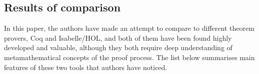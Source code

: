 \documentclass[article]{aaltoseries}
\begin{document}



\subsection{Results of comparison}
\label{sec:joint_comparison}

In this paper, the authors have made an attempt to compare to different theorem provers, Coq and Isabelle/HOL, and both of them have been found highly developed and valuable, although they both require deep understanding of metamathematical concepts of the proof process. The list below summarises main features of these two tools that authors have noticed.
\end{document}
